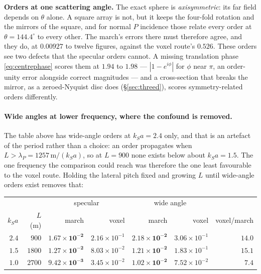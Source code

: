 \documentclass[11pt,a4paper]{article}
\begin{document}
\noindent
\textbf{Orders at one scattering angle.}  The exact sphere is
\emph{axisymmetric}: its far field depends on $\theta$ alone.  A square array
is not, but it keeps the four-fold rotation and the mirrors of the square, and
for normal $P$ incidence those relate every order at $\theta=144.4^{\circ}$ to
every other.  The march's errors there must therefore agree, and they do, at
$0.00927$ to twelve figures, against the voxel route's $0.526$.  These orders
see two defects that the specular orders cannot.  A missing translation phase
\eqref{eq:centrephase} scores them at $1.94$ to $1.98$ --- $|1-e^{i\phi}|$ for
$\phi$ near $\pi$, an order-unity error alongside correct magnitudes --- and a
cross-section that breaks the mirror, as a zeroed-Nyquist disc does
(\S\ref{sec:threed}), scores symmetry-related orders differently.

\paragraph{Wide angles at lower frequency, where the confound is removed.}
The table above has wide-angle orders at $k_Sa=2.4$ only, and that is an
artefact of the period rather than a choice: an order propagates when
$L>\lambda_P=1257\,\text{m}/(k_Sa)$, so at $L=900$ none exists below about
$k_Sa=1.5$.  The one frequency the comparison could reach was therefore the one
least favourable to the voxel route.  Holding the lateral pitch fixed and
growing $L$ until wide-angle orders exist removes that:

\begin{center}
\begin{tabular}{@{}rrrrrrr@{}}
\toprule
& & \multicolumn{2}{c}{specular} & \multicolumn{2}{c}{wide angle} & \\
\cmidrule(lr){3-4}\cmidrule(lr){5-6}
$k_Sa$ & $L$ (m) & march & voxel & march & voxel & voxel/march\\
\midrule
$2.4$ & $900$  & $\mathbf{1.67\times10^{-2}}$ & $2.16\times10^{-1}$
       & $\mathbf{2.18\times10^{-2}}$ & $3.06\times10^{-1}$ & $14.0$\\
$1.5$ & $1800$ & $\mathbf{1.27\times10^{-2}}$ & $8.03\times10^{-2}$
       & $\mathbf{1.21\times10^{-2}}$ & $1.83\times10^{-1}$ & $15.1$\\
$1.0$ & $2700$ & $\mathbf{9.42\times10^{-3}}$ & $3.45\times10^{-2}$
       & $\mathbf{1.02\times10^{-2}}$ & $7.52\times10^{-2}$ & $7.4$\\
\bottomrule
\end{tabular}
\end{center}
\end{document}
